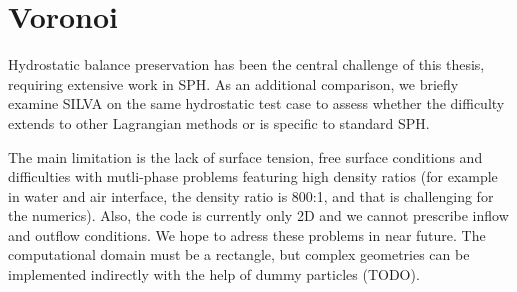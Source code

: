 \documentclass[../main.tex]{subfiles}
\begin{document}
\chapter{Voronoi}
\label{chap:VORONOI}

Hydrostatic balance preservation has been the central challenge of this thesis, requiring extensive work in SPH. As an additional comparison, we briefly examine SILVA on the same hydrostatic test case to assess whether the difficulty extends to other Lagrangian methods or is specific to standard SPH.

The main limitation is the lack of surface tension, free surface conditions and difficulties with mutli-phase problems featuring high density ratios (for example in water and air interface, the density ratio is 800:1, and that is challenging for the numerics). Also, the code is currently only 2D and we cannot prescribe inflow and outflow conditions. We hope to adress these problems in near future. The computational domain must be a rectangle, but complex geometries can be implemented indirectly with the help of dummy particles (TODO).
\end{document}
